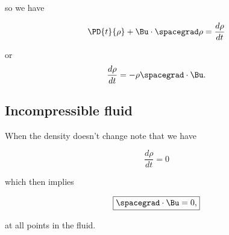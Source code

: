 so we have

\begin{equation}\label{eqn:continuumL9:510}
\PD{t}{\rho} + \Bu \cdot \spacegrad \rho = \frac{d\rho}{dt}
\end{equation}

or
\begin{equation}\label{eqn:continuumL9:530}
\frac{d\rho}{dt} = - \rho \spacegrad \cdot \Bu.
\end{equation}

\subsection{Incompressible fluid}

When the density doesn't change note that we have

\begin{equation}\label{eqn:continuumL9:550}
\frac{d\rho}{dt} = 0
\end{equation}

which then implies

\begin{equation}\label{eqn:continuumL9:570}
\boxed{
\spacegrad \cdot \Bu = 0,
}
\end{equation}

at all points in the fluid.


\EndArticle
